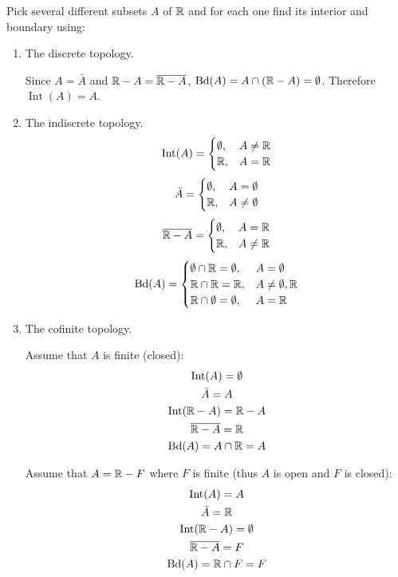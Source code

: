 \documentclass[letterpaper,12pt,fleqn]{article}
\DeclareMathOperator{\Int}{Int}
\DeclareMathOperator{\Bd}{Bd}
\begin{document}
\begin{example}
  Pick several different subsets \(A\) of \(\mathbb{R}\) and for each one find its interior and boundary using:
  \begin{enumerate}
  \item The discrete topology.

    Since \(A=\bar{A}\) and \(\mathbb{R}-A=\overline{\mathbb{R}-A}\), \(\Bd(A)=A\cap(\R-A)=\emptyset\).  Therefore \(\Int(A)=A\).

  \item The indiscrete topology.
    \[\Int(A)=\begin{cases}
    \emptyset, & A\ne\R \\
    \R, & A=\R
    \end{cases}\]
    \[\bar{A}=\begin{cases}
    \emptyset, & A=\emptyset \\
    \mathbb{R}, & A\ne\emptyset
    \end{cases}\]
    \[\overline{\mathbb{R}-A}=\begin{cases}
    \emptyset, & A=\mathbb{R} \\
    \mathbb{R}, & A\ne\mathbb{R}
    \end{cases}\]
    \[\Bd(A)=\begin{cases}
    \emptyset\cap\R=\emptyset, & A=\emptyset \\
    \R\cap\R=\R, & A\ne\emptyset,\R \\
    \R\cap\emptyset=\emptyset, & A=\R
    \end{cases}\]

  \item The cofinite topology.

    Assume that \(A\) is finite (closed):
    \begin{gather*}
      \Int(A)=\emptyset \\
      \bar{A}=A \\
      \Int(\R-A)=\R-A \\
      \overline{\R-A}=\R \\
      \Bd(A)=A\cap\R=A
    \end{gather*}

    Assume that \(A=\mathbb{R}-F\) where \(F\) is finite (thus \(A\) is open and \(F\) is closed):
    \begin{gather*}
      \Int(A)=A \\
      \bar{A}=\R \\
      \Int(\R-A)=\emptyset \\
      \overline{\R-A}=F \\
      \Bd(A)=\R\cap F=F
    \end{gather*}


\end{enumerate}
\end{example}
\end{document}
